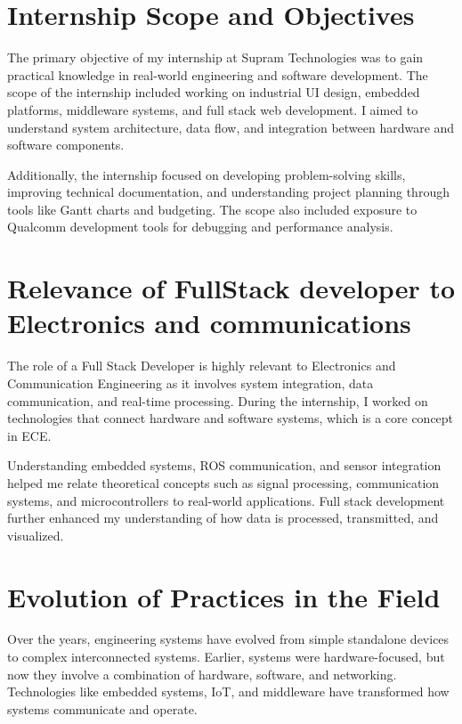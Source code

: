\documentclass[12pt,a4paper]{report}
\begin{document}
\section{Internship Scope and Objectives}

The primary objective of my internship at Supram Technologies was to gain practical knowledge in real-world engineering and software development. The scope of the internship included working on industrial UI design, embedded platforms, middleware systems, and full stack web development. I aimed to understand system architecture, data flow, and integration between hardware and software components.


Additionally, the internship focused on developing problem-solving skills, improving technical documentation, and understanding project planning through tools like Gantt charts and budgeting. The scope also included exposure to Qualcomm development tools for debugging and performance analysis.


\section{Relevance of FullStack developer to Electronics and communications}

The role of a Full Stack Developer is highly relevant to Electronics and Communication Engineering as it involves system integration, data communication, and real-time processing. During the internship, I worked on technologies that connect hardware and software systems, which is a core concept in ECE.


Understanding embedded systems, ROS communication, and sensor integration helped me relate theoretical concepts such as signal processing, communication systems, and microcontrollers to real-world applications. Full stack development further enhanced my understanding of how data is processed, transmitted, and visualized.


\section{Evolution of Practices in the Field}

Over the years, engineering systems have evolved from simple standalone devices to complex interconnected systems. Earlier, systems were hardware-focused, but now they involve a combination of hardware, software, and networking. Technologies like embedded systems, IoT, and middleware have transformed how systems communicate and operate.
\end{document}
